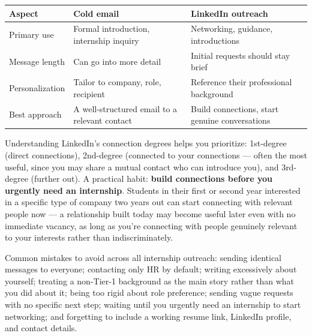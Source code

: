 \begin{longtable}{p{} p{} p{}}
\toprule
\textbf{Aspect} & \textbf{Cold email} & \textbf{LinkedIn outreach} \\
\midrule
\endhead
Primary use & Formal introduction, internship inquiry & Networking, guidance, introductions \\
Message length & Can go into more detail & Initial requests should stay brief \\
Personalization & Tailor to company, role, recipient & Reference their professional background \\
Best approach & A well-structured email to a relevant contact & Build connections, start genuine conversations
\\
\bottomrule
\end{longtable}

Understanding LinkedIn's connection degrees helps you prioritize: 1st-degree (direct connections), 2nd-degree
(connected to your connections — often the most useful, since you may share a mutual contact who can introduce
you), and 3rd-degree (further out). A practical habit: \textbf{build connections before you urgently need an
internship}. Students in their first or second year interested in a specific type of company two years out can
start connecting with relevant people now — a relationship built today may become useful later even with no
immediate vacancy, as long as you're connecting with people genuinely relevant to your interests rather than
indiscriminately.

\begin{keytakeaway}
Common mistakes to avoid across all internship outreach: sending identical messages to everyone; contacting only
HR by default; writing excessively about yourself; treating a non-Tier-1 background as the main story rather
than what you did about it; being too rigid about role preference; sending vague requests with no specific next
step; waiting until you urgently need an internship to start networking; and forgetting to include a working
resume link, LinkedIn profile, and contact details.
\end{keytakeaway}

